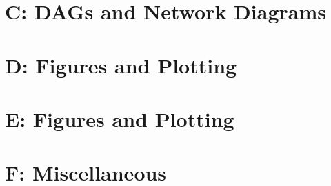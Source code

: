 \documentclass[]{article}
\theoremstyle{plain}
\theoremstyle{remark}
\theoremstyle{definition}
\begin{document}
\section*{C: DAGs and Network Diagrams}


\section*{D: Figures and Plotting}


\section*{E: Figures and Plotting}


\section*{F: Miscellaneous}
	
\end{document}

